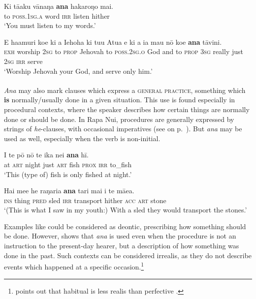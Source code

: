 \ea\label{ex:11.175}
\gll Ki tā{\ꞌ}aku vānaŋa \textbf{ana} hakaroŋo mai. \\
to \textsc{poss.1sg.a} word \textsc{irr} listen hither \\

\glt 
‘You must listen to my words.’ \textstyleExampleref{[R229.280]} 
\z

\ea\label{ex:11.176}
\gll E ha{\ꞌ}amuri koe ki a Iehoha ki tu{\ꞌ}u {\ꞌ}Atua  {\ꞌ}e ki a ia mau nō koe \textbf{ana} tāvini.\\
\textsc{exh} worship \textsc{2sg} to \textsc{prop} Jehovah to \textsc{poss.2sg.o} God  and to \textsc{prop} \textsc{3sg} really just \textsc{2sg} \textsc{irr} serve\\

\glt 
‘Worship Jehovah your God, and serve only him.’ \textstyleExampleref{[Mat. 4:10]}
\z

\paragraph{} \textit{Ana} may also mark clauses which express a \textsc{general practice}, something which \textbf{is} normally/usually done in a given situation. This use is found especially in procedural contexts, where the speaker describes how certain things are normally done or should be done. In Rapa Nui, procedures are generally expressed by strings of \textit{he}{}-clauses, with occasional imperatives (see  on p.~\pageref{ex:7.5}). But \textit{ana} may be used as well, especially when the verb is non-initial. 

\ea\label{ex:11.177}
\gll {\ꞌ}I te pō nō te ika nei \textbf{ana} hī. \\
at \textsc{art} night just \textsc{art} fish \textsc{prox} \textsc{irr} to\_fish \\

\glt 
‘This (type of) fish is only fished at night.’ \textstyleExampleref{[R364.007]} 
\z

\ea\label{ex:11.178}
\gll Hai me{\ꞌ}e he raŋaria \textbf{ana} tari mai i te mā{\ꞌ}ea. \\
\textsc{ins} thing \textsc{pred} sled \textsc{irr} transport hither \textsc{acc} \textsc{art} stone \\

\glt
‘(This is what I saw in my youth:) With a sled they would transport the stones.’ \textstyleExampleref{[R107.044]} 
\z

Examples like  could be considered as deontic, prescribing how something should be done. However,  shows that \textit{ana} is used even when the procedure is not an instruction to the present-day hearer, but a description of how something was done in the past. Such contexts can be considered irrealis, as they do not describe events which happened at a specific occasion.\footnote{\label{fn:523}\citet[245]{Payne1997} points out that habitual  is less realis than perfective .} 

